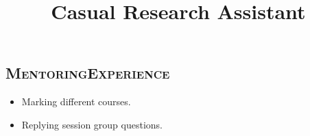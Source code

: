 \begin{resume}









\section{\textsc{Mentoring\qquad Experience}}


\title{\bf Casual Research Assistant}
\begin{position}
\vspace*{-.4cm}
\begin{itemize}
\item Marking different courses.
\item Replying session group questions. 
\end{itemize}
\end{position}


\end{resume}
